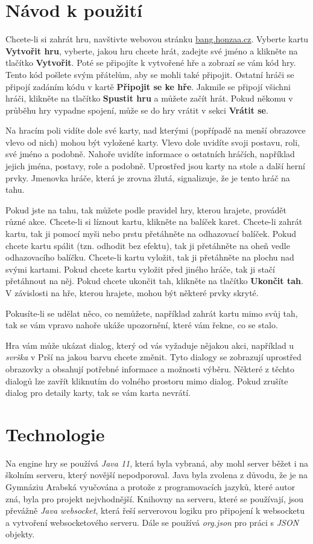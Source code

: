 \section{Návod k použití}
Chcete-li si zahrát hru, navštivte webovou stránku \href{https://bang.honzaa.cz}{bang.honzaa.cz}. Vyberte kartu \textbf{Vytvořit hru}, vyberte, jakou hru chcete hrát, zadejte své jméno a klikněte na tlačítko \textbf{Vytvořit}. Poté se připojíte k vytvořené hře a zobrazí se vám kód hry. Tento kód pošlete svým přátelům, aby se mohli také připojit. Ostatní hráči se připojí zadáním kódu v kartě \textbf{Připojit se ke hře}. Jakmile se připojí všichni hráči, klikněte na tlačítko \textbf{Spustit hru} a můžete začít hrát. Pokud někomu v průběhu hry vypadne spojení, může se do hry vrátit v sekci \textbf{Vrátit se}.

Na hracím poli vidíte dole své karty, nad kterými (popřípadě na menší obrazovce vlevo od nich) mohou být vyložené karty. Vlevo dole uvidíte svoji postavu, roli, své jméno a podobně. Nahoře uvidíte informace o ostatních hráčích, například jejich jména, postavy, role a podobně. Uprostřed jsou karty na stole a další herní prvky. Jmenovka hráče, která je zrovna žlutá, signalizuje, že je tento hráč na tahu.

Pokud jste na tahu, tak můžete podle pravidel hry, kterou hrajete, provádět různé akce. Chcete-li si líznout kartu, klikněte na balíček karet. Chcete-li zahrát kartu, tak ji pomocí myši nebo prstu přetáhněte na odhazovací balíček. Pokud chcete kartu spálit (tzn. odhodit bez efektu), tak ji přetáhněte na oheň vedle odhazovacího balíčku. Chcete-li kartu vyložit, tak ji přetáhněte na plochu nad svými kartami. Pokud chcete kartu vyložit před jiného hráče, tak ji stačí přetáhnout na něj. Pokud chcete ukončit tah, klikněte na tlačítko \textbf{Ukončit tah}. V závislosti na hře, kterou hrajete, mohou být některé prvky skryté.

Pokusíte-li se udělat něco, co nemůžete, například zahrát kartu mimo svůj tah, tak se vám vpravo nahoře ukáže upozornění, které vám řekne, co se stalo.

Hra vám může ukázat dialog, který od vás vyžaduje nějakou akci, například u \emph{svrška} v Prší na jakou barvu chcete změnit. Tyto dialogy se zobrazují uprostřed obrazovky a obsahují potřebné informace a možnosti výběru. Některé z těchto dialogů lze zavřít kliknutím do volného prostoru mimo dialog. Pokud zrušíte dialog pro detaily karty, tak se vám karta nevrátí.

\section{Technologie}
Na engine hry se používá \emph{Java 11}, která byla vybraná, aby mohl server běžet i na školním serveru, který novější nepodporoval. Java byla zvolena z důvodu, že je na Gymnáziu Arabská vyučována a protože z programovacích jazyků, které autor zná, byla pro projekt nejvhodnější. Knihovny na serveru, které se používají, jsou převážně \emph{Java websocket}, která řeší serverovou logiku pro připojení k websocketu a vytvoření websocketového serveru. Dále se používá \emph{org.json} pro práci s \emph{JSON} objekty.

